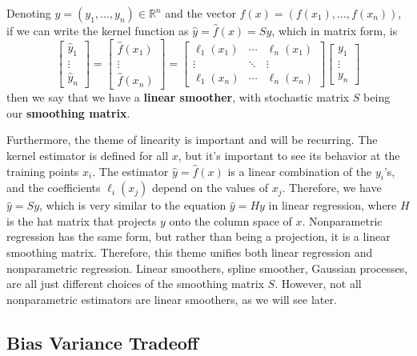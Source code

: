   Denoting $y = (y_1, \ldots, y_n) \in \mathbb{R}^n$ and the vector $f(x) = (f(x_1), \ldots, f(x_n))$, if we can write the kernel function as $\hat{y} = \hat{f}(x) = S y$, which in matrix form, is 
  \begin{equation}
    \begin{bmatrix} \hat{y}_1 \\ \vdots \\ \hat{y}_n \end{bmatrix} = \begin{bmatrix} \hat{f}(x_1) \\ \vdots \\ \hat{f} (x_n) \end{bmatrix} = \begin{bmatrix} \ell_1 (x_1) & \cdots & \ell_n (x_1) \\ \vdots & \ddots & \vdots \\ \ell_1 (x_n) & \cdots & \ell_n (x_n) \end{bmatrix} \begin{bmatrix} y_1 \\ \vdots \\ y_n \end{bmatrix} 
  \end{equation}
  then we say that we have a \textbf{linear smoother}, with stochastic matrix $S$ being our \textbf{smoothing matrix}. 

  Furthermore, the theme of linearity is important and will be recurring. The kernel estimator is defined for all $x$, but it's important to see its behavior at the training points $x_i$. The estimator $\hat{y} = \hat{f}(x)$ is a linear combination of the $y_i$'s, and the coefficients $\ell_i (x_j)$ depend on the values of $x_j$. Therefore, we have $\hat{y} = S y$, which is very similar to the equation $\hat{y} = H y$ in linear regression, where $H$ is the hat matrix that projects $y$ onto the column space of $x$. Nonparametric regression has the same form, but rather than being a projection, it is a linear smoothing matrix. Therefore, this theme unifies both linear regression and nonparametric regression. Linear smoothers, spline smoother, Gaussian processes, are all just different choices of the smoothing matrix $S$. However, not all nonparametric estimators are linear smoothers, as we will see later.

\subsection{Bias Variance Tradeoff}

